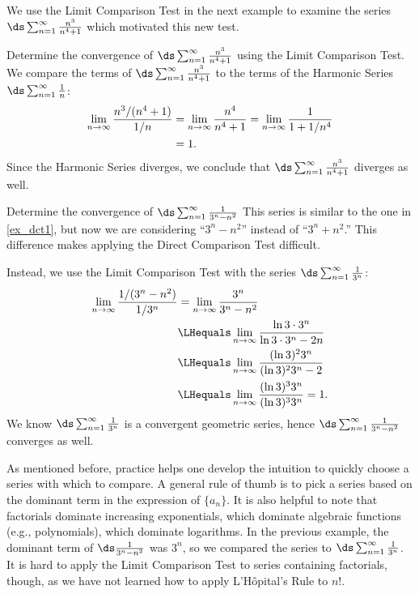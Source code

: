 We use the Limit Comparison Test in the next example to examine the series $\ds\sum_{n=1}^\infty \frac{n^3}{n^4+1}$ which motivated this new test.

\begin{example}\label{ex_lct1}%
Determine the convergence of $\ds\sum_{n=1}^\infty \frac{n^3}{n^4+1}$ using the Limit Comparison Test.
\solution
We compare the terms of $\ds\sum_{n=1}^\infty \frac{n^3}{n^4+1}$ to the terms of the Harmonic Series $\ds\sum_{n=1}^\infty \frac1{n}$:
\begin{align*}
	\lim_{n\to\infty}\frac{{n^3}/(n^4+1)}{1/n}
	&= \lim_{n\to\infty} \frac{n^4}{n^4+1}= \lim_{n\to\infty} \frac{1}{1+1/n^4} \\
	&= 1.\vspace{-.5\baselineskip}
\end{align*}
Since the Harmonic Series diverges, we conclude that $\ds\sum_{n=1}^\infty \frac{n^3}{n^4+1}$ diverges as well.
\end{example}

\begin{example}\label{ex_lct2}%
Determine the convergence of $\ds\sum_{n=1}^\infty \frac1{3^n-n^2}$
\solution
This series is similar to the one in \autoref{ex_dct1}, but now we are considering ``$3^n-n^2$'' instead of ``$3^n+n^2$.'' This difference makes applying the Direct Comparison Test difficult.

Instead, we use the Limit Comparison Test %
with the series $\ds\sum_{n=1}^\infty \frac1{3^n}$:
\begin{align*}
	\lim_{n\to\infty}\frac{1/(3^n-n^2)}{1/3^n}
	&= \lim_{n\to\infty}\frac{3^n}{3^n-n^2} \\
	& \LHequals \lim_{n\to\infty} \frac{\ln 3 \cdot 3^n}{\ln 3 \cdot 3^n -2n}\\
	& \LHequals \lim_{n\to\infty} \frac {(\ln 3)^2 3^n}{(\ln 3)^2 3^n -2}\\
	& \LHequals \lim_{n\to\infty} \frac {(\ln 3)^3 3^n}{(\ln 3)^3 3^n}=1.
\end{align*}
We know $\ds\sum_{n=1}^\infty \frac1{3^n}$ is a convergent geometric series, hence $\ds\sum_{n=1}^\infty \frac1{3^n-n^2}$ converges as well.
\end{example}

As mentioned before, practice helps one develop the intuition to quickly choose a series with which to compare. A general rule of thumb is to pick a series based on the dominant term in the expression of $\{a_n\}$. It is also helpful to note that factorials dominate increasing exponentials, which dominate algebraic functions (e.g., polynomials), which dominate logarithms. In the previous example, the dominant term of $\ds\frac{1}{3^n-n^2}$ was $3^n$, so we compared the series to $\ds \sum_{n=1}^\infty \frac1{3^n}$. It is hard to apply the Limit Comparison Test to series containing factorials, though, as we have not learned how to apply L'Hôpital's Rule to $n!$.

